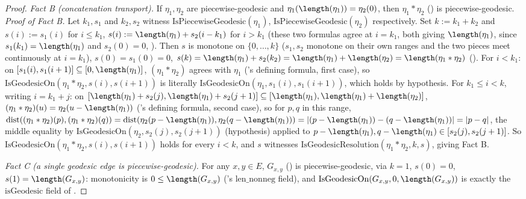 \begin{proof}
  \emph{Fact B (concatenation transport).} If $\eta_1,\eta_2$ are piecewise-geodesic and
  $\eta_1(\length(\eta_1))=\eta_2(0)$, then $\eta_1 * \eta_2$ () is
  piecewise-geodesic. \emph{Proof of Fact B.} Let $k_1,s_1$ and $k_2,s_2$ witness
  $\mathrm{IsPiecewiseGeodesic}(\eta_1)$, $\mathrm{IsPiecewiseGeodesic}(\eta_2)$ respectively. Set
  $k:=k_1+k_2$ and $s(i) := s_1(i)$ for $i \le k_1$, $s(i):=\length(\eta_1)+s_2(i-k_1)$ for $i > k_1$
  (these two formulas agree at $i=k_1$, both giving $\length(\eta_1)$, since $s_1(k_1)=\length(\eta_1)$
  and $s_2(0)=0$, ). Then $s$ is monotone on $\{0,\dotsc,k\}$
  ($s_1,s_2$ monotone on their own ranges and the two pieces meet continuously at $i=k_1$), $s(0) =
  s_1(0)=0$, $s(k)=\length(\eta_1)+s_2(k_2)=\length(\eta_1)+\length(\eta_2)=\length(\eta_1*\eta_2)$
  (). For $i<k_1$: on $[s_1(i),s_1(i+1)]\subseteq[0,\length(\eta_1)]$,
  $(\eta_1*\eta_2)$ agrees with $\eta_1$ ('s defining formula, first case),
  so $\mathrm{IsGeodesicOn}(\eta_1*\eta_2,s(i),s(i+1))$ is literally
  $\mathrm{IsGeodesicOn}(\eta_1,s_1(i),s_1(i+1))$, which holds by hypothesis. For $k_1 \le i < k$,
  writing $i=k_1+j$: on $[\length(\eta_1)+s_2(j),\length(\eta_1)+s_2(j+1)] \subseteq
  [\length(\eta_1),\length(\eta_1)+\length(\eta_2)]$, $(\eta_1*\eta_2)(u) = \eta_2(u-\length(\eta_1))$
  ('s defining formula, second case), so for $p,q$ in this range,
  $\mathrm{dist}((\eta_1*\eta_2)(p),(\eta_1*\eta_2)(q)) =
  \mathrm{dist}(\eta_2(p-\length(\eta_1)),\eta_2(q-\length(\eta_1))) = |(p-\length(\eta_1)) -
  (q-\length(\eta_1))| = |p-q|$, the middle equality by
  $\mathrm{IsGeodesicOn}(\eta_2,s_2(j),s_2(j+1))$ (hypothesis) applied to $p-\length(\eta_1),
  q-\length(\eta_1) \in [s_2(j),s_2(j+1)]$. So $\mathrm{IsGeodesicOn}(\eta_1*\eta_2,s(i),s(i+1))$
  holds for every $i<k$, and $s$ witnesses $\mathrm{IsGeodesicResolution}(\eta_1*\eta_2,k,s)$,
  giving Fact B.

  \emph{Fact C (a single geodesic edge is piecewise-geodesic).} For any $x,y \in E$,
  $G_{x,y}$ () is piecewise-geodesic, via $k=1$, $s(0)=0$,
  $s(1)=\length(G_{x,y})$: monotonicity is $0 \le \length(G_{x,y})$ ('s
  $\mathrm{len\_nonneg}$ field), and $\mathrm{IsGeodesicOn}(G_{x,y},0,\length(G_{x,y}))$ is exactly
  the $\mathrm{isGeodesic}$ field of .


\end{proof}
